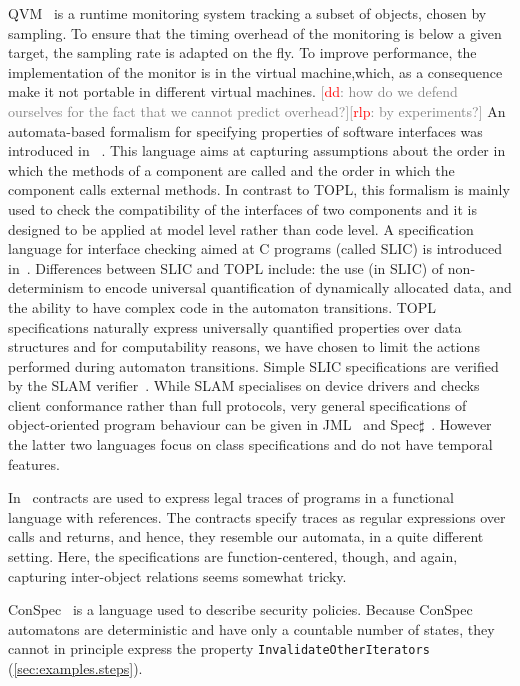 \documentclass{sigplanconf}[10pt] %
\newcommand{\noterg}[2]{\textcolor{gray}{[\textcolor{red}{#1}: #2]}}
\newcommand{\rlp}[1]{\noterg{rlp}{#1}}
\newcommand{\dd}[1]{\noterg{dd}{#1}}
\begin{document}
QVM~\cite{arnold:2008} is a runtime monitoring system tracking a subset of objects, chosen by
sampling. To ensure that the timing overhead of the monitoring is below a given target, the sampling rate is 
adapted on the fly.
To improve performance,  the implementation of the monitor is in the virtual machine,which, as a consequence make it not portable in
different virtual machines.
\dd{how do we defend ourselves for the fact that we cannot predict
  overhead?}\rlp{by experiments?}
An automata-based formalism for specifying properties of software interfaces was introduced in~\cite{dblp:conf/sigsoft/AlfaroH01} .
This language aims at capturing assumptions about the order in which the methods of a component are called and the order in which the component calls external methods.
In contrast to TOPL, this formalism is mainly used to check the compatibility of the interfaces of two components and it is designed to be applied at  model level rather than code level.
A specification language for interface checking aimed at C programs (called SLIC) is introduced in~\cite{ball2002}.
Differences between SLIC and TOPL include: the use (in SLIC) of non-determinism to encode universal quantification of dynamically allocated data, and the  ability to have complex code in the automaton transitions.
TOPL specifications naturally express universally quantified properties over data structures and for computability reasons,  we have chosen to limit the  actions performed during automaton transitions.
Simple SLIC specifications are verified by  the SLAM verifier~\cite{dblp:conf/cav/ballr01}.
While SLAM specialises on device drivers and checks client conformance rather than full protocols,
very general specifications of object-oriented program behaviour can be given in JML~\cite{jml} and Spec$\sharp$~\cite{DBLP:journals/jot/BarnettDFLS04}. However the latter two languages focus on class specifications and do not have temporal features.

In~\cite{disney2011} contracts are used to express legal traces of programs in a functional language with references.
The contracts specify traces as regular expressions over calls and returns, and hence, they resemble our automata, in a quite different setting.
Here, the specifications are function-centered, though, and again, capturing inter-object relations seems somewhat tricky.

ConSpec~\cite{DBLP:journals/entcs/AktugN08} is a language used to describe security policies.
Because ConSpec automatons are deterministic and have only a countable number of states, they cannot in principle express the property \texttt{InvalidateOtherIterators} (\autoref{sec:examples.steps}).
\end{document}
